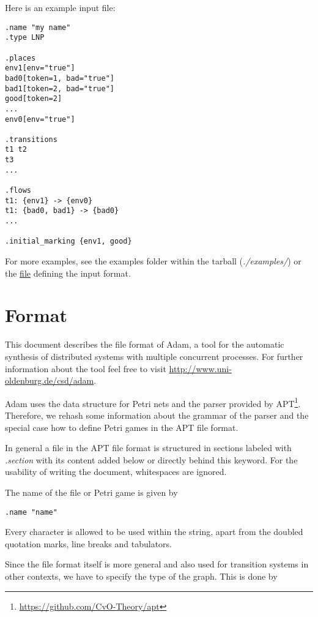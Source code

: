 \documentclass[runningheads]{./llncs/llncs}
\newcommand{\tool}{{\sc Adam}}
\begin{document}
Here is an example input file:

\begin{lstlisting}[language=apt-format]
.name "my name"
.type LNP

.places
env1[env="true"]
bad0[token=1, bad="true"]
bad1[token=2, bad="true"]
good[token=2]
...
env0[env="true"]

.transitions
t1 t2
t3
...

.flows
t1: {env1} -> {env0}
t1: {bad0, bad1} -> {bad0}
...

.initial_marking {env1, good}
\end{lstlisting}

For more examples, see the examples folder within the tarball (\emph{./examples/}) or 
the \href{http://www.uni-oldenburg.de/fileadmin/user\_upload/f2inform-csd/adam/format.pdf}{file} defining the input format.

\section{Format}
This document describes the file format of \tool{}, a tool for the automatic synthesis of distributed systems with multiple concurrent processes. For further information about the tool feel free to visit \url{http://www.uni-oldenburg.de/csd/adam}.

\tool{} uses the data structure for Petri nets and the parser provided by APT\footnote{\url{https://github.com/CvO-Theory/apt}}. Therefore, we rehash some information about the grammar of the parser and the special case how to define Petri games in the APT file format.

In general a file in the APT file format is structured in sections labeled with \textit{.section} with its content added below or directly behind this keyword. For the usability of writing the document, whitespaces are ignored.

The name of the file or Petri game is given by 

\begin{lstlisting}[language=apt-format]
.name "name"
\end{lstlisting}

Every character is allowed to be used within the string, apart from the doubled quotation marks, line breaks and tabulators.

Since the file format itself is more general and also used for transition systems in other contexts, we have to specify the type of the graph. This is done by
\end{document}
